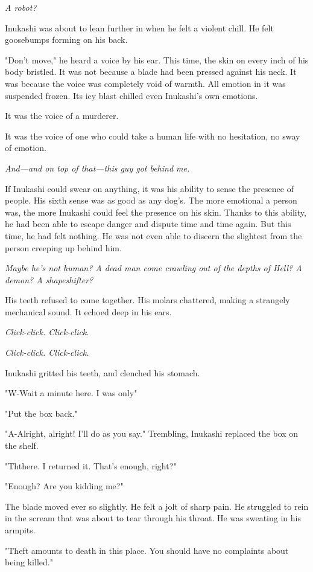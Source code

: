 \emph{A robot?}

Inukashi was about to lean further in when he felt a violent chill. He
felt goosebumps forming on his back.

"Don't move," he heard a voice by his ear. This time, the skin on every
inch of his body bristled. It was not because a blade had been pressed
against his neck. It was because the voice was completely void of
warmth. All emotion in it was suspended frozen. Its icy blast chilled
even Inukashi's own emotions.

It was the voice of a murderer.

It was the voice of one who could take a human life with no hesitation,
no sway of emotion.

\emph{And---and on top of that---this guy got behind me.}

If Inukashi could swear on anything, it was his ability to sense the
presence of people. His sixth sense was as good as any dog's. The more
emotional a person was, the more Inukashi could feel the presence on his
skin. Thanks to this ability, he had been able to escape danger and
dispute time and time again. But this time, he had felt nothing. He was
not even able to discern the slightest from the person creeping up
behind him.

\emph{Maybe he's not human? A dead man come crawling out of the depths of
Hell? A demon? A shapeshifter?}

His teeth refused to come together. His molars chattered, making a
strangely mechanical sound. It echoed deep in his ears.

\emph{Click-click. Click-click.}

\emph{Click-click. Click-click.}

Inukashi gritted his teeth, and clenched his stomach.

"W-Wait a minute here. I was only\el "

"Put the box back."

"A-Alright, alright! I'll do as you say." Trembling, Inukashi replaced
the box on the shelf.

"Th\el there. I returned it. That's enough, right?"

"Enough? Are you kidding me?"

The blade moved ever so slightly. He felt a jolt of sharp pain. He
struggled to rein in the scream that was about to tear through his
throat. He was sweating in his armpits.

"Theft amounts to death in this place. You should have no complaints
about being killed."

